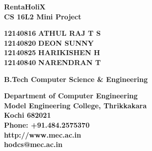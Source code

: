 \documentclass[11pt]{report}
\begin{document}
\begin{titlepage}
\begin{center}

\Huge{\textbf{RentaHoliX}}\\
\vspace{0.05in}
\large{\textbf{CS 16L2 Mini Project\\}}
\vspace{1.2in}



\begin{center}

\Large{\textbf{12140816}}  \Large{\textbf{ATHUL RAJ T S}}\\ 
\Large{\textbf{12140820}}  \Large{\textbf{DEON SUNNY}}\\ 
\Large{\textbf{12140825}}  \Large{\textbf{HARIKISHEN H}}\\
\Large{\textbf{12140840}}  \Large{\textbf{NARENDRAN T}}\\

\end{center}

\Large{\textbf{
B.Tech Computer Science \& Engineering
}}


\vspace{2.0in}
\begin{figure}[h]
\begin{center}

\end{center}
\end{figure}
\textbf{
Department of Computer Engineering\\
Model Engineering College, Thrikkakara\\
Kochi 682021\\
Phone: +91.484.2575370\\
http://www.mec.ac.in\\
hodcs@mec.ac.in\\
}
\end{center}
\end{titlepage}



\end{document}
